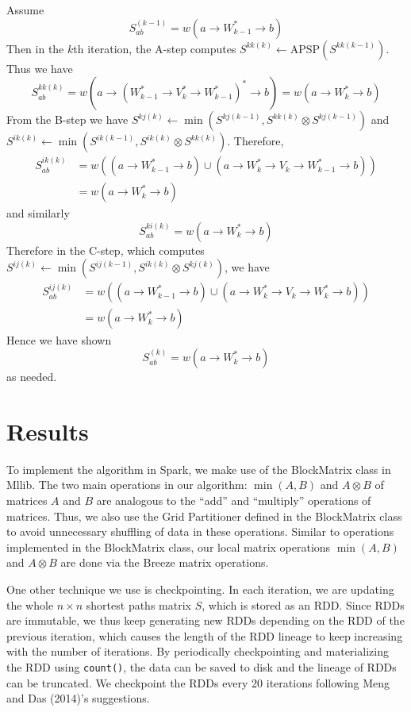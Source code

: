 \documentclass{article} %
\begin{document}
Assume
\[
S^{(k-1)}_{ab} = w(a \to W_{k-1}^* \to b)
\]
Then in the $k$th iteration, the A-step computes
$S^{kk(k)} \leftarrow \text{APSP}(S^{kk(k-1)})$.
Thus we have
\[
S^{kk(k)}_{ab} = w(a \to (W_{k-1}^* \to V_k^* \to W_{k-1}^*)^* \to b) = w(a \to W_k^* \to b)
\]
From the B-step we have
 $S^{kj(k)} \leftarrow \min(S^{kj(k-1)}, S^{kk(k)} \otimes S^{kj(k-1)})$ 
and 
$S^{ik(k)} \leftarrow \min(S^{ik(k-1)}, S^{ik(k)} \otimes S^{kk(k)})$.
Therefore,
\begin{align*}
S^{ik(k)}_{ab} &= w((a \to W_{k-1}^* \to b) \cup (a \to W_k^* \to V_k \to W_{k-1}^* \to b))\\
&= w(a \to W_k^* \to b)
\end{align*}
and similarly
\[
S^{ki(k)}_{ab} = w(a \to W_k^* \to b)
\]
Therefore in the C-step, which computes
$S^{ij(k)} \leftarrow \min(S^{ij(k-1)}, S^{ik(k)} \otimes S^{kj(k)})$,
we have
\begin{align*}
S^{ij(k)}_{ab} &= w((a \to W_{k-1}^* \to b) \cup (a \to W_k^* \to V_k \to W_k^* \to b))\\
&= w(a \to W_k^* \to b)
\end{align*}
Hence we have shown
\[
S^{(k)}_{ab} = w(a \to W_k^* \to b)
\]
as needed.

\section{Results}
To implement the algorithm in Spark, we make use of
the BlockMatrix class in Mllib. The two main operations
in our algorithm: $\min(A, B)$ and $A \otimes B$ of matrices
$A$ and $B$ are analogous to the ``add'' and ``multiply''
operations of matrices. Thus, we also use the Grid Partitioner defined in the BlockMatrix class to avoid 
unnecessary shuffling of data in these operations.
Similar to operations implemented in the BlockMatrix class, our local matrix operations $\min(A, B)$ and $A \otimes B$
are done via the Breeze matrix operations.

One other technique we use is checkpointing. In each iteration, we are updating the whole $n \times n$ shortest paths matrix $S$, which is stored as an RDD. Since RDDs are immutable, we thus keep
generating new RDDs depending on the RDD of the previous iteration, which causes the length of the RDD lineage to keep increasing with the number of iterations.
By periodically checkpointing and materializing the RDD using {\tt count()}, the data can be saved to disk and the lineage of RDDs can be truncated. We checkpoint the RDDs
every 20 iterations following Meng and Das (2014)'s suggestions. 
\end{document}
